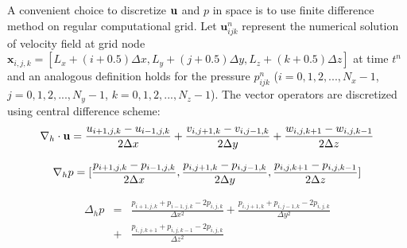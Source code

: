 A convenient choice to discretize $\mathbf{u}$ and $p$ in space is to use finite difference method on regular computational grid. Let $\mathbf{u}^n_{ijk}$ represent the
numerical solution of velocity field at grid node  $\mathbf{x}_{i,j,k} =
[L_x+(i+0.5)\Delta x,L_y+(j+0.5)\Delta y, L_z+(k+0.5)\Delta z]$ at time $t^n$ 
and an analogous definition holds for the pressure $p^n_{ijk}$ ($i =
0,1,2,...,N_x-1$, $j = 0,1,2,...,N_y-1$, $k = 0,1,2,...,N_z-1$). The vector operators are discretized using central difference scheme:
\begin{equation} 
\nabla_h\cdot \mathbf{u} =
\frac{u_{i+1,j,k}-u_{i-1,j,k}}{2\Delta x} +
\frac{v_{i,j+1,k}-v_{i,j-1,k}}{2\Delta y} +
\frac{w_{i,j,k+1}-w_{i,j,k-1}}{2\Delta z}
\end{equation}

\begin{equation}
\nabla_h p =
[\frac{p_{i+1,j,k}-p_{i-1,j,k}}{2\Delta x},
\frac{p_{i,j+1,k}-p_{i,j-1,k}}{2\Delta y},
\frac{p_{i,j,k+1}-p_{i,j,k-1}}{2\Delta z}]\\    
\end{equation}

\begin{eqnarray}[lll]
\Delta_h p & = & \frac{p_{i+1,j,k}+p_{i-1,j,k}-2p_{i,j,k}}{\Delta x^2} +
\frac{p_{i,j+1,k}+p_{i,j-1,k}-2p_{i,j,k}}{\Delta y^2} \\
 \quad & + & \frac{p_{i,j,k+1}+p_{i,j,k-1}-2p_{i,j,k}}{\Delta z^2} 
\end{eqnarray}

